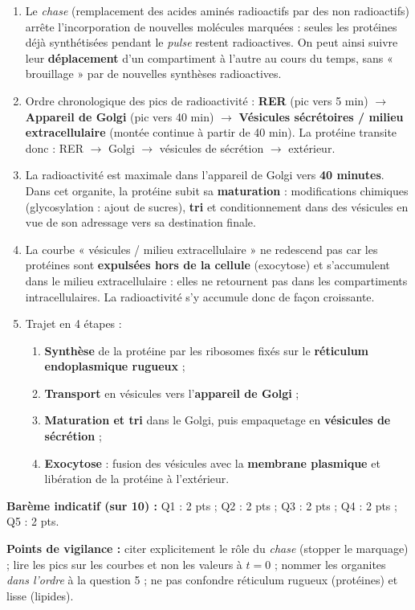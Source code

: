 \documentclass[11pt]{article}
\begin{document}
\begin{corrige}
\begin{enumerate}
    \item Le \emph{chase} (remplacement des acides aminés radioactifs par des non radioactifs) arrête l'incorporation de nouvelles molécules marquées : seules les protéines déjà synthétisées pendant le \emph{pulse} restent radioactives. On peut ainsi suivre leur \textbf{déplacement} d'un compartiment à l'autre au cours du temps, sans « brouillage » par de nouvelles synthèses radioactives.
    \item Ordre chronologique des pics de radioactivité : \textbf{RER} (pic vers 5 min) $\rightarrow$ \textbf{Appareil de Golgi} (pic vers 40 min) $\rightarrow$ \textbf{Vésicules sécrétoires / milieu extracellulaire} (montée continue à partir de 40 min). La protéine transite donc : RER $\rightarrow$ Golgi $\rightarrow$ vésicules de sécrétion $\rightarrow$ extérieur.
    \item La radioactivité est maximale dans l'appareil de Golgi vers \textbf{40 minutes}. Dans cet organite, la protéine subit sa \textbf{maturation} : modifications chimiques (glycosylation : ajout de sucres), \textbf{tri} et conditionnement dans des vésicules en vue de son adressage vers sa destination finale.
    \item La courbe « vésicules / milieu extracellulaire » ne redescend pas car les protéines sont \textbf{expulsées hors de la cellule} (exocytose) et s'accumulent dans le milieu extracellulaire : elles ne retournent pas dans les compartiments intracellulaires. La radioactivité s'y accumule donc de façon croissante.
    \item Trajet en 4 étapes :
    \begin{enumerate}
        \item \textbf{Synthèse} de la protéine par les ribosomes fixés sur le \textbf{réticulum endoplasmique rugueux} ;
        \item \textbf{Transport} en vésicules vers l'\textbf{appareil de Golgi} ;
        \item \textbf{Maturation et tri} dans le Golgi, puis empaquetage en \textbf{vésicules de sécrétion} ;
        \item \textbf{Exocytose} : fusion des vésicules avec la \textbf{membrane plasmique} et libération de la protéine à l'extérieur.
    \end{enumerate}
\end{enumerate}
\textbf{Barème indicatif (sur 10) :} Q1 : 2 pts ; Q2 : 2 pts ; Q3 : 2 pts ; Q4 : 2 pts ; Q5 : 2 pts.\par
\textbf{Points de vigilance :} citer explicitement le rôle du \emph{chase} (stopper le marquage) ; lire les pics sur les courbes et non les valeurs à $t=0$ ; nommer les organites \emph{dans l'ordre} à la question 5 ; ne pas confondre réticulum rugueux (protéines) et lisse (lipides).
\end{corrige}
\end{document}
